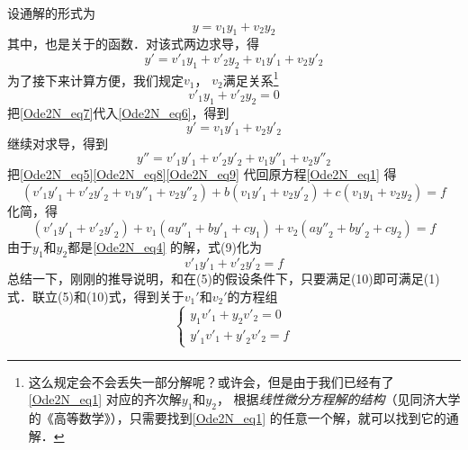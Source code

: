 设通解的形式为
\begin{equation}\label{Ode2N_eq5}
y = {v_1}{y_1} + {v_2}{y_2}
\end{equation}
其中，也是关于的函数．对该式两边求导，得
\begin{equation}\label{Ode2N_eq6}
y' = {v'_1}{y_1} + {v'_2}{y_2} + {v_1}{y'_1} + {v_2}{y'_2}
\end{equation}
为了接下来计算方便，我们规定$v_1$，  $v_2$满足关系\footnote{这么规定会不会丢失一部分解呢？或许会，但是由于我们已经有了\autoref{Ode2N_eq1} 对应的齐次解$y_1$和$y_2$， 根据\emph{线性微分方程解的结构}（见同济大学的《高等数学》），只需要找到\autoref{Ode2N_eq1} 的任意一个解，就可以找到它的通解．}
\begin{equation}\label{Ode2N_eq7}
{v'_1}{y_1} + {v'_2}{y_2} = 0
\end{equation}
把\autoref{Ode2N_eq7}代入\autoref{Ode2N_eq6}，得到
\begin{equation}\label{Ode2N_eq8}
y' = {v_1}{y'_1} + {v_2}{y'_2}
\end{equation}
继续对求导，得到
\begin{equation}\label{Ode2N_eq9}
y'' = {v'_1}{y'_1} + {v'_2}{y'_2} + {v_1}{y''_1} + {v_2}{y''_2}
\end{equation}
把\autoref{Ode2N_eq5}\autoref{Ode2N_eq8}\autoref{Ode2N_eq9} 代回原方程\autoref{Ode2N_eq1} 得
\begin{equation} \left( {{{v'}_1}{{y'}_1} + {{v'}_2}{{y'}_2} + {v_1}{{y''}_1} + {v_2}{{y''}_2}} \right) + b\left( {{v_1}{{y'}_1} + {v_2}{{y'}_2}} \right) + c\left( {{v_1}{y_1} + {v_2}{y_2}} \right) = f \end{equation}
化简，得
\begin{equation}\left( {{{v'}_1}{{y'}_1} + {{v'}_2}{{y'}_2}} \right) + {v_1}\left( {a{{y''}_1} + b{{y'}_1} + c{y_1}} \right) + {v_2}\left( {a{{y''}_2} + b{{y'}_2} + c{y_2}} \right) = f \end{equation}
由于$y_1$和$y_2$都是\autoref{Ode2N_eq4} 的解，式(9)化为 %
\begin{equation} {v'_1}{y'_1} + {v'_2}{y'_2} = f \end{equation}
总结一下，刚刚的推导说明，和在(5)的假设条件下，只要满足(10)即可满足(1)式．联立(5)和(10)式，得到关于$v_1'$和$v_2'$的方程组
\begin{equation}
\left\{ \begin{array}{l}
{y_1}{{v'}_1} + {y_2}{{v'}_2} = 0\\
{{y'}_1}{{v'}_1} + {{y'}_2}{{v'}_2} = f
\end{array} \right.
\end{equation}
